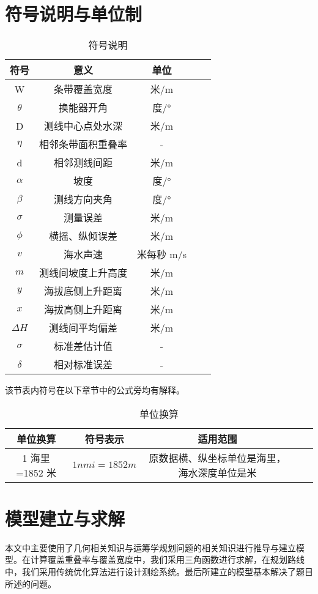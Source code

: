 \documentclass[withoutpreface,bwprint]{cumcmthesis} %
\begin{document}
\section{符号说明与单位制}
\begin{table}[!htbp]
    \caption{符号说明}\label{tab:001} \centering
    \begin{tabular}{ccccc}
        \toprule[1.5pt]
        符号 & 意义  & 单位\\
        \midrule[1pt]
        W & 条带覆盖宽度 & 米/m\\
		$\theta$ & 换能器开角 & 度/°\\
		D & 测线中心点处水深 & 米/m\\
		$\eta$ & 相邻条带面积重叠率 & - \\
		d & 相邻测线间距 & 米/m\\
		$\alpha$ & 坡度 & 度/° \\
		$\beta$ & 测线方向夹角 & 度/°\\
		$\sigma$ & 测量误差 & 米/m \\
		$\phi$ & 横摇、纵倾误差 & 米/m \\
		$v$ & 海水声速 & 米每秒 m/s\\
		$m$&测线间坡度上升高度&米/m\\
		$y$&海拔底侧上升距离&米/m\\
		$x$&海拔高侧上升距离&米/m\\
		$\Delta H$&测线间平均偏差&米/m\\
		$\sigma$&标准差估计值&-\\
		$\delta$&相对标准误差&-\\

        \bottomrule[1.5pt]
    \end{tabular}
\end{table}
该节表内符号在以下章节中的公式旁均有解释。

\begin{table}[!htbp]
    \caption{单位换算}\label{tab:001} \centering
    \begin{tabular}{ccccc}
        \toprule[1.5pt]
        单位换算 & 符号表示  & 适用范围\\
        \midrule[1pt]
        1 海里=1852 米 & $1nmi=1852m$ & 原数据横、纵坐标单位是海里，海水深度单位是米 \\
        \bottomrule[1.5pt]
    \end{tabular}
\end{table}

\section{模型建立与求解}
本文中主要使用了几何相关知识与运筹学规划问题的相关知识进行推导与建立模型。在计算覆盖重叠率与覆盖宽度中，我们采用三角函数进行求解，在规划路线中，我们采用传统优化算法进行设计测绘系统。最后所建立的模型基本解决了题目所述的问题。
\end{document}

